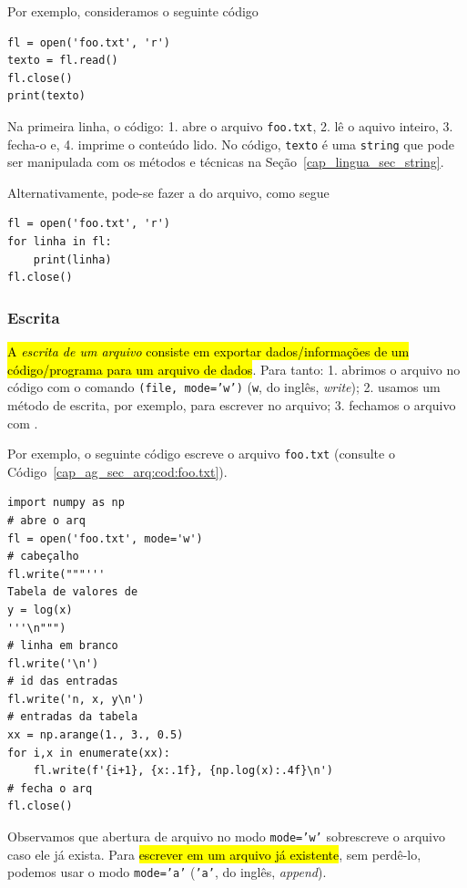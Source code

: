 Por exemplo, consideramos o seguinte código

\begin{lstlisting}
fl = open('foo.txt', 'r')
texto = fl.read()
fl.close()
print(texto)
\end{lstlisting}

Na primeira linha, o código: 1. abre o arquivo \texttt{foo.txt}, 2. lê o aquivo inteiro, 3. fecha-o e, 4. imprime o conteúdo lido. No código, \texttt{texto} é uma \texttt{string} que pode ser manipulada com os métodos e técnicas na Seção~\ref{cap_lingua_sec_string}.

Alternativamente, pode-se fazer a  do arquivo, como segue

\begin{lstlisting}
fl = open('foo.txt', 'r')
for linha in fl:
    print(linha)
fl.close()
\end{lstlisting}

\subsubsection{Escrita}

\hl{A \emph{escrita de um arquivo} consiste em exportar dados/informações de um código/programa para um arquivo de dados}. Para tanto: 1. abrimos o arquivo no código com o comando {\PYTHONopen}\texttt{(file, mode='w')} (\texttt{w}, do inglês, \textit{write}); 2. usamos um método de escrita, por exemplo, {\PYTHONfileDOTwrite} para escrever no arquivo; 3. fechamos o arquivo com {\PYTHONfileDOTclose}.

Por exemplo, o seguinte código escreve o arquivo \texttt{foo.txt} (consulte o Código~\ref{cap_ag_sec_arq:cod:foo.txt}).

\begin{lstlisting}[caption=foo.py, label=cap_ag_sec_arq:cod:foo.py]
import numpy as np
# abre o arq
fl = open('foo.txt', mode='w')
# cabeçalho
fl.write("""'''
Tabela de valores de
y = log(x)
'''\n""")
# linha em branco
fl.write('\n')
# id das entradas
fl.write('n, x, y\n')
# entradas da tabela
xx = np.arange(1., 3., 0.5)
for i,x in enumerate(xx):
    fl.write(f'{i+1}, {x:.1f}, {np.log(x):.4f}\n')
# fecha o arq
fl.close()
\end{lstlisting}

Observamos que abertura de arquivo no modo \texttt{mode='w'} sobrescreve o arquivo caso ele já exista. Para \hl{escrever em um arquivo já existente}, sem perdê-lo, podemos usar o modo \texttt{mode='a'} (\texttt{'a'}, do inglês, \textit{append}).


